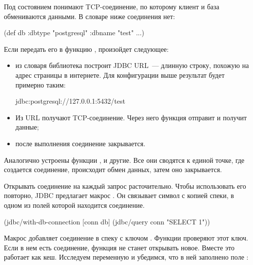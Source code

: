 Под состоянием понимают TCP-соединение, по которому клиент и база обмениваются данными. В словаре ниже соединения нет:

\begin{english}
  \begin{clojure}
(def db {:dbtype "postgresql"
         :dbname "test"
         ...})
  \end{clojure}
\end{english}

Если передать его в функцию , произойдет следующее:

\begin{itemize}

\item
  из словаря библиотека построит JDBC URL~--- длинную строку, похожую на адрес страницы в интернете. Для конфигурации выше результат будет примерно таким:

\begin{english}
  \begin{text}
jdbc:postgresql://127.0.0.1:5432/test
  \end{text}
\end{english}

\item
  Из URL получают TCP-соединение. Через него функция  отправит и получит данные;

\item
  после выполнения  соединение закрывается.

\end{itemize}


Аналогично устроены функции ,  и другие. Все они сводятся к единой точке, где создается соединение, происходит обмен данных, затем оно закрывается.

Открывать соединение на каждый запрос расточительно. Чтобы использовать его повторно, JDBC предлагает макрос . Он связывает символ с копией спеки, в одном из полей которой находится соединение.

\begin{english}
  \begin{clojure}
(jdbc/with-db-connection
  [conn db]
  (jdbc/query conn "SELECT 1"))
  \end{clojure}
\end{english}

Макрос добавляет соединение в спеку с ключом . Функции проверяют этот ключ. Если в нем есть соединение, функция не станет открывать новое. Вместе это работает как кеш. Исследуем переменную  и убедимся, что в ней заполнено поле  :

